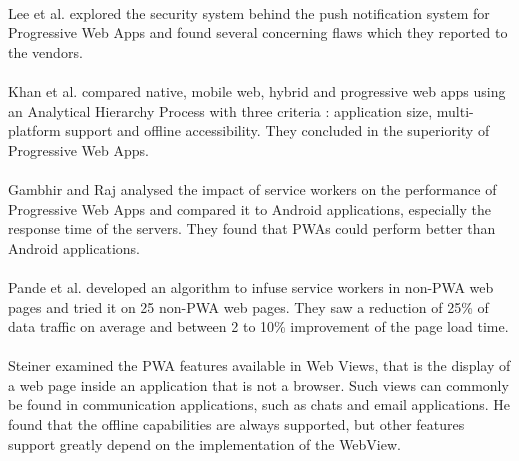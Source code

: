 \documentclass{kththesis}
\begin{document}
\paragraph{}
Lee et al. \cite{Pride_Prejudice} explored the security system behind the push notification system for Progressive Web Apps and found several concerning flaws which they reported to the vendors.

\paragraph{}
Khan et al. \cite{pwa_ahp} compared native, mobile web, hybrid and progressive web apps using an Analytical Hierarchy Process with three criteria : application size, multi-platform support and offline accessibility. They concluded in the superiority of Progressive Web Apps.


\paragraph{}
Gambhir and Raj \cite{gambhir2018analysis} analysed the impact of service workers on the performance of Progressive Web Apps and compared it to Android applications, especially the response time of the servers. They found that PWAs could perform better than Android applications.

\paragraph{}
Pande et al.\cite{pande2018enhanced} developed an algorithm to infuse service workers in non-PWA web pages and tried it on 25 non-PWA web pages. They saw a reduction of 25\% of data traffic on average and between 2 to 10\% improvement of the page load time.

\paragraph{}
Steiner \cite{steiner2018web} examined the PWA features available in Web Views, that is the display of a web page inside an application that is not a browser. Such views can commonly be found in communication applications, such as chats and email applications. He found that the offline capabilities are always supported, but other features support greatly depend on the implementation of the WebView.
\end{document}
